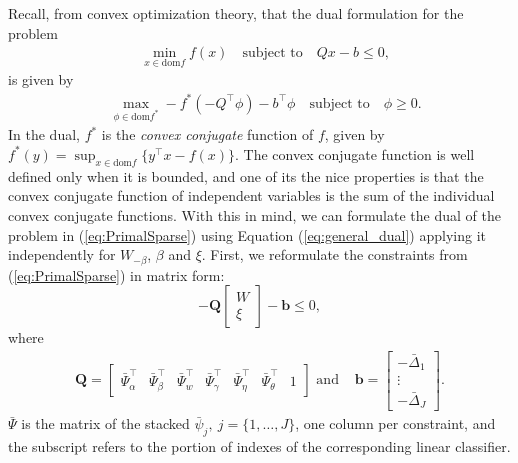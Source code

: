 Recall, from convex optimization theory, that the dual formulation for the problem
\begin{equation}
\begin{split}
&\min_{x \in \text{dom$f$}} f(x) \quad  \text{subject to} \quad Qx-b \le 0,
\end{split}
\end{equation}
is given by
\begin{equation}
\begin{split}
\label{eq:general_dual}
&\max_{\phi \in \text{dom$f^*$}} -f^*(-Q^\top \phi) - b^\top\phi \quad \text{subject to} \quad \phi \ge 0.
\end{split}
\end{equation}
In the dual, $f^*$ is the \emph{convex conjugate} function of $f$, given by $f^*(y) = \sup_{x \in \text{dom$f$}}\{y^\top x-f(x)\}$. The convex conjugate function is well defined only when it is bounded, and one of its the nice properties is that the convex conjugate function of independent variables is the sum of the individual convex conjugate functions. With this in mind, we can formulate the dual of the problem in (\ref{eq:PrimalSparse}) using Equation (\ref{eq:general_dual}) applying it independently for $W_{-\beta}$, $\beta$ and $\xi$. First, we reformulate the constraints from (\ref{eq:PrimalSparse}) in matrix form:
\begin{equation}
\label{eq:const_matrix}
- \mathbf{Q}\begin{bmatrix} W \\ \xi \end{bmatrix} - \mathbf{b} \le 0,
\end{equation}
where
\begin{equation}
\begin{split}
\mathbf{Q} = \begin{bmatrix}  \bar\Psi_\alpha^\top & \bar\Psi_\beta^\top  &   \bar\Psi_w^\top  & \bar\Psi_\gamma^\top & \bar\Psi_\eta^\top &  \bar\Psi_\theta^\top & 1  \end{bmatrix} \text{   and   }
\end{split}
\begin{split}
\mathbf{b}= \begin{bmatrix} -\bar \Delta_1 \\ \vdots \\ -\bar \Delta_J \end{bmatrix}.
\end{split}
\end{equation}
$\bar \Psi$ is the matrix of the stacked $\bar\psi_j,~j=\{1,\dots,J\}$, one column per constraint, and the subscript refers to the portion of indexes of the  corresponding linear classifier.

